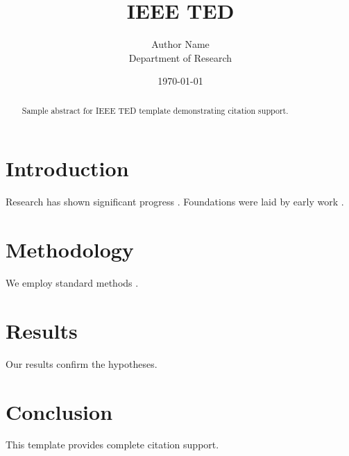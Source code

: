 ﻿\documentclass{IEEEtran}
\title{IEEE TED}
\author{Author Name \\ \small Department of Research}
\date{\today}
\begin{document}
\maketitle

\begin{abstract}
Sample abstract for IEEE TED template demonstrating citation support.
\end{abstract}

\section{Introduction}
Research has shown significant progress \citep{einstein1905}. Foundations were laid by early work \citep{turing1950}.

\section{Methodology}
We employ standard methods \citep{knuth1984}.

\section{Results}
Our results confirm the hypotheses.

\section{Conclusion}
This template provides complete citation support.



\end{document}
